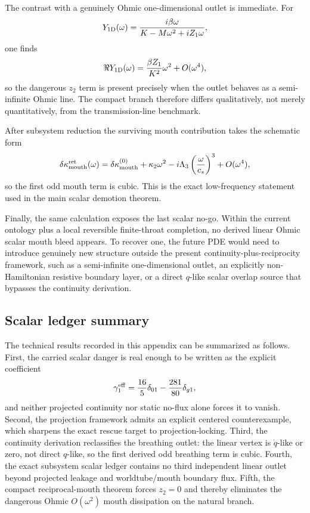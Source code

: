 \documentclass[11pt]{article}
\begin{document}
The contrast with a genuinely Ohmic one-dimensional outlet is immediate.  For
\[
Y_{1\rm D}(\omega)=\frac{i\beta\omega}{K-M\omega^2+iZ_1\omega},
\]
one finds
\[
\Re Y_{1\rm D}(\omega)=\frac{\beta Z_1}{K^2}\omega^2+O(\omega^4),
\]
so the dangerous $z_2$ term is present precisely when the outlet behaves as a
semi-infinite Ohmic line.  The compact branch therefore differs qualitatively,
not merely quantitatively, from the transmission-line benchmark.

After subsystem reduction the surviving mouth contribution takes the schematic
form
\[
\delta\kappa_{\rm mouth}^{\rm ret}(\omega)
=
\delta\kappa_{\rm mouth}^{(0)}+\kappa_2\omega^2-i\Lambda_3\left(\frac{\omega}{c_s}\right)^3+O(\omega^4),
\]
so the first odd mouth term is cubic.  This is the exact low-frequency statement
used in the main scalar demotion theorem.

Finally, the same calculation exposes the last scalar no-go.  Within the current
ontology plus a local reversible finite-throat completion, no derived linear
Ohmic scalar mouth bleed appears.  To recover one, the future PDE would need to
introduce genuinely new structure outside the present continuity-plus-reciprocity
framework, such as a semi-infinite one-dimensional outlet, an explicitly
non-Hamiltonian resistive boundary layer, or a direct $q$-like scalar overlap
source that bypasses the continuity derivation.

\subsection{Scalar ledger summary}
\label{app:scalar-ledger-summary}

The technical results recorded in this appendix can be summarized as follows.
First, the carried scalar danger is real enough to be written as the explicit
coefficient
\[
\gamma_1^{\rm eff}=\frac{16}{5}\delta_{01}-\frac{281}{80}\delta_{g1},
\]
and neither projected continuity nor static no-flux alone forces it to vanish.
Second, the projection framework admits an explicit centered counterexample,
which sharpens the exact rescue target to projection-locking.  Third, the
continuity derivation reclassifies the breathing outlet: the linear vertex is
$\dot q$-like or zero, not direct $q$-like, so the first derived odd breathing
term is cubic.  Fourth, the exact subsystem scalar ledger contains no third
independent linear outlet beyond projected leakage and worldtube/mouth boundary
flux.  Fifth, the compact reciprocal-mouth theorem forces $z_2=0$ and thereby
eliminates the dangerous Ohmic $O(\omega^2)$ mouth dissipation on the natural
branch.
\end{document}
